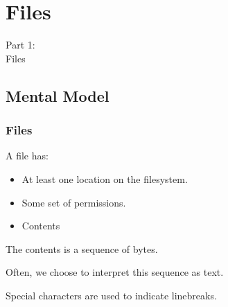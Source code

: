 \definecolor{files}{rgb}{    \componentA, \componentB, \componentC}
\definecolor{re}{rgb}{       \componentB, \componentC, \componentA}
\definecolor{json}{rgb}{     \componentC, \componentA, \componentB}
\definecolor{processes}{rgb}{\componentA, \componentB, \componentC}
\definecolor{env}{rgb}{      \componentB, \componentC, \componentA}
\definecolor{ex}{rgb}{       \componentC, \componentA, \componentB}


{
\renewcommand{\bgcolor}{files}

\section{Files}
\begin{frame}
    \vspace{25mm}
    \begin{center}
        \Huge{Part 1:\\Files}
    \end{center}
\end{frame}

\subsection{Mental Model}
\begin{frame}
  \frametitle{Files }
  \vspace{3mm}
  A file has:
  \begin{itemize}
    \item At least one location on the filesystem.
    \item Some set of permissions.
    \item Contents
  \end{itemize}
  
  \pause
  \vspace{5mm}
  The contents is a sequence of bytes.
  
  \pause
  \vspace{5mm}
  Often, we choose to interpret this sequence as text.
  
  \pause
  \vspace{5mm}
  Special characters are used to indicate linebreaks.
\end{frame}

}
